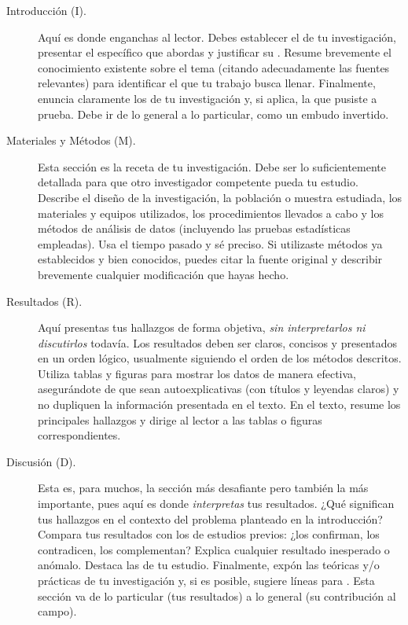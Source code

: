 \begin{description} \item[Introducción (I).] Aquí es donde enganchas al lector.
	      Debes establecer el  de tu investigación, presentar el  específico que abordas y justificar su .
	      Resume brevemente el conocimiento existente sobre el tema (citando adecuadamente las fuentes relevantes) para identificar el  que tu trabajo busca llenar.
	      Finalmente, enuncia claramente los  de tu investigación y, si aplica, la  que pusiste a prueba.
	      Debe ir de lo general a lo particular, como un embudo invertido.

	\item[Materiales y Métodos (M).] Esta sección es la receta de tu investigación.
	      Debe ser lo suficientemente detallada para que otro investigador competente pueda  tu estudio.
	      Describe el diseño de la investigación, la población o muestra estudiada, los materiales y equipos utilizados, los procedimientos llevados a cabo y los métodos de análisis de datos (incluyendo las pruebas estadísticas empleadas).
	      Usa el tiempo pasado y sé preciso.
	      Si utilizaste métodos ya establecidos y bien conocidos, puedes citar la fuente original y describir brevemente cualquier modificación que hayas hecho.

	\item[Resultados (R).] Aquí presentas tus hallazgos de forma objetiva, \emph{sin interpretarlos ni discutirlos} todavía.
	      Los resultados deben ser claros, concisos y presentados en un orden lógico, usualmente siguiendo el orden de los métodos descritos.
	      Utiliza tablas y figuras para mostrar los datos de manera efectiva, asegurándote de que sean autoexplicativas (con títulos y leyendas claros) y no dupliquen la información presentada en el texto.
	      En el texto, resume los principales hallazgos y dirige al lector a las tablas o figuras correspondientes.

	\item[Discusión (D).] Esta es, para muchos, la sección más desafiante pero también la más importante, pues aquí es donde \emph{interpretas} tus resultados.
	      ¿Qué significan tus hallazgos en el contexto del problema planteado en la introducción?
	      Compara tus resultados con los de estudios previos: ¿los confirman, los contradicen, los complementan?
	      Explica cualquier resultado inesperado o anómalo.
	      Destaca las  de tu estudio.
	      Finalmente, expón las  teóricas y/o prácticas de tu investigación y, si es posible, sugiere líneas para .
	      Esta sección va de lo particular (tus resultados) a lo general (su contribución al campo).


\end{description}
